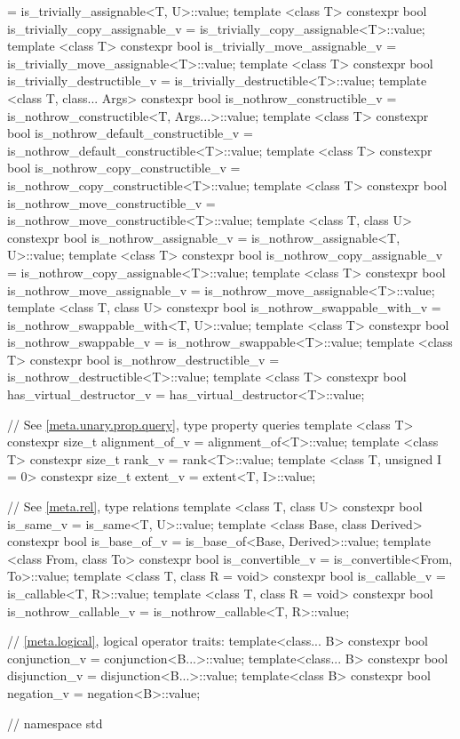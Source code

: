 \begin{codeblock}
{    = is_trivially_assignable<T, U>::value;
  template <class T> constexpr bool is_trivially_copy_assignable_v
    = is_trivially_copy_assignable<T>::value;
  template <class T> constexpr bool is_trivially_move_assignable_v
    = is_trivially_move_assignable<T>::value;
  template <class T> constexpr bool is_trivially_destructible_v
    = is_trivially_destructible<T>::value;
  template <class T, class... Args> constexpr bool is_nothrow_constructible_v
    = is_nothrow_constructible<T, Args...>::value;
  template <class T> constexpr bool is_nothrow_default_constructible_v
    = is_nothrow_default_constructible<T>::value;
  template <class T> constexpr bool is_nothrow_copy_constructible_v
    = is_nothrow_copy_constructible<T>::value;
  template <class T> constexpr bool is_nothrow_move_constructible_v
    = is_nothrow_move_constructible<T>::value;
  template <class T, class U> constexpr bool is_nothrow_assignable_v
    = is_nothrow_assignable<T, U>::value;
  template <class T> constexpr bool is_nothrow_copy_assignable_v
    = is_nothrow_copy_assignable<T>::value;
  template <class T> constexpr bool is_nothrow_move_assignable_v
    = is_nothrow_move_assignable<T>::value;
  template <class T, class U> constexpr bool is_nothrow_swappable_with_v
    = is_nothrow_swappable_with<T, U>::value;
  template <class T> constexpr bool is_nothrow_swappable_v
    = is_nothrow_swappable<T>::value;
  template <class T> constexpr bool is_nothrow_destructible_v
    = is_nothrow_destructible<T>::value;
  template <class T> constexpr bool has_virtual_destructor_v
    = has_virtual_destructor<T>::value;

  // See \ref{meta.unary.prop.query}, type property queries
  template <class T> constexpr size_t alignment_of_v
    = alignment_of<T>::value;
  template <class T> constexpr size_t rank_v
    = rank<T>::value;
  template <class T, unsigned I = 0> constexpr size_t extent_v
    = extent<T, I>::value;

  // See \ref{meta.rel}, type relations
  template <class T, class U> constexpr bool is_same_v
    = is_same<T, U>::value;
  template <class Base, class Derived> constexpr bool is_base_of_v
    = is_base_of<Base, Derived>::value;
  template <class From, class To> constexpr bool is_convertible_v
    = is_convertible<From, To>::value;
  template <class T, class R = void> constexpr bool is_callable_v
    = is_callable<T, R>::value;
  template <class T, class R = void> constexpr bool is_nothrow_callable_v
    = is_nothrow_callable<T, R>::value;

  // \ref{meta.logical}, logical operator traits:
  template<class... B> constexpr bool conjunction_v = conjunction<B...>::value;
  template<class... B> constexpr bool disjunction_v = disjunction<B...>::value;
  template<class B> constexpr bool negation_v = negation<B>::value;
} // namespace std
\end{codeblock}

